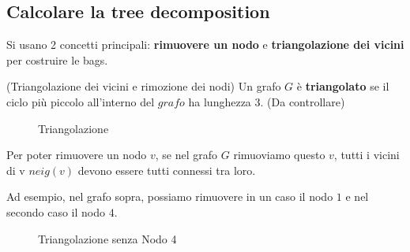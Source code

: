 \subsection{Calcolare la tree decomposition}

Si usano 2 concetti principali: \textbf{rimuovere un nodo} e
\textbf{triangolazione dei vicini} per costruire le bags.

\begin{definition}(Triangolazione dei vicini e rimozione dei nodi)
    Un grafo $G$ è \textbf{triangolato} se il ciclo più piccolo all'interno del $grafo$ ha lunghezza 3. (Da controllare)
    \begin{figure}[H]
        \begin{center}
        \end{center}
        \caption{Triangolazione}
    \end{figure}

    Per poter rimuovere un nodo $v$, se nel grafo $G$ rimuoviamo questo $v$, tutti
    i vicini di v $neig(v)$ devono essere tutti connessi tra loro.

    Ad esempio, nel grafo sopra, possiamo rimuovere in un caso il nodo $1$ e nel
    secondo caso il nodo $4$.

    \begin{figure}[H]
        \begin{center}
        \end{center}
        \caption{Triangolazione senza Nodo 4}
    \end{figure}


\end{definition}
